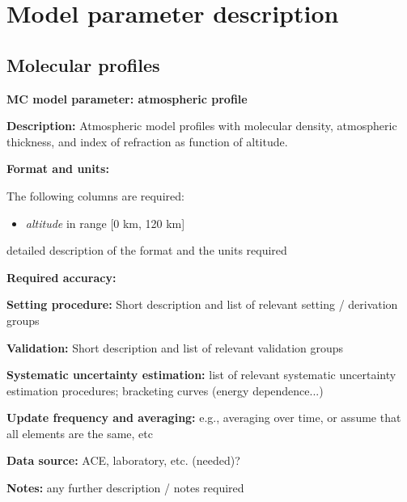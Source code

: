 \section{Model parameter description}

\subsection{Molecular profiles}

\textbf{MC model parameter: atmospheric profile}

\textbf{Description: }
Atmospheric model profiles with molecular density, atmospheric thickness, and index of refraction as function of altitude.

\textbf{Format and units:}

The following columns are required:
\begin{itemize}
\item \textit{altitude} in range [0 km, 120 km]

\end{itemize}

detailed description of the format and the units required

\textbf{Required accuracy:}

\textbf{Setting procedure:}
Short description and list of relevant setting / derivation groups

\textbf{Validation:}
Short description and list of relevant validation groups 

\textbf{Systematic uncertainty estimation:}
list of relevant systematic uncertainty estimation procedures; bracketing curves (energy dependence...) 

\textbf{Update frequency and averaging:}
e.g., averaging over time, or assume that all elements are the same, etc

\textbf{Data source:}
ACE, laboratory, etc. (needed)?

\textbf{Notes:}
 any further description / notes required
